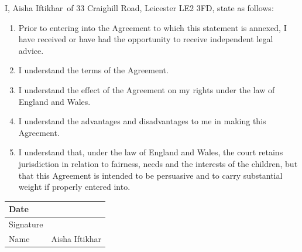 \documentclass[10pt,a4paper]{article}
\newcommand{\PartyTwo}{Aisha Iftikhar}
\newcommand{\CurrentHome}{33 Craighill Road, Leicester LE2 3FD}
\begin{document}
\noindent I, \PartyTwo\ of \CurrentHome, state as follows:

\begin{enumerate}[label=\arabic*., leftmargin=1.8em]
    \item Prior to entering into the Agreement to which this statement is annexed, I have received or have had the opportunity to receive independent legal advice.
    \item I understand the terms of the Agreement.
    \item I understand the effect of the Agreement on my rights under the law of England and Wales.
    \item I understand the advantages and disadvantages to me in making this Agreement.
    \item I understand that, under the law of England and Wales, the court retains jurisdiction in relation to fairness, needs and the interests of the children, but that this Agreement is intended to be persuasive and to carry substantial weight if properly entered into.
\end{enumerate}

\vspace{0.8em}

\begin{tabularx}{\textwidth}{|Y|Y|}
\hline
Date & \\[0.8cm]
\hline
Signature & \\[1cm]
\hline
Name & \PartyTwo \\[0.6cm]
\hline
\end{tabularx}
\end{document}
